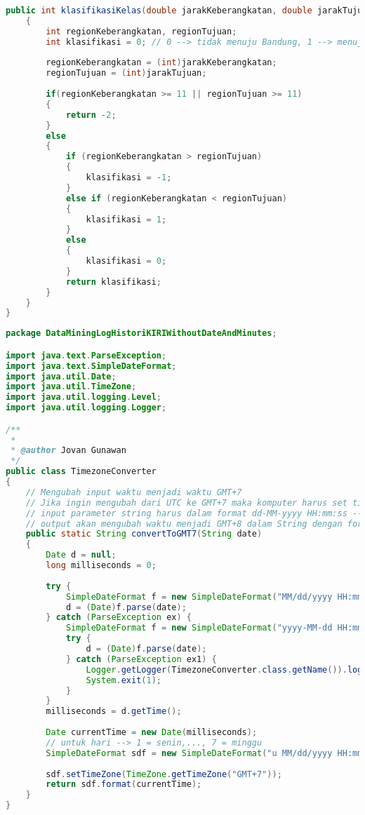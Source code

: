 \begin{lstlisting}[language=Java,basicstyle=\tiny,caption=ProcessingData.java]
    public int klasifikasiKelas(double jarakKeberangkatan, double jarakTujuan)
    {
        int regionKeberangkatan, regionTujuan;
        int klasifikasi = 0; // 0 --> tidak menuju Bandung, 1 --> menuju Bandung, 2 --> menuju region yang sama
        
        regionKeberangkatan = (int)jarakKeberangkatan;
        regionTujuan = (int)jarakTujuan;
        
        if(regionKeberangkatan >= 11 || regionTujuan >= 11)
        {
            return -2;
        }
        else
        {
            if (regionKeberangkatan > regionTujuan)
            {
                klasifikasi = -1;
            }
            else if (regionKeberangkatan < regionTujuan)
            {
                klasifikasi = 1;
            }
            else
            {
                klasifikasi = 0;
            }
            return klasifikasi;
        }
    }
}
\end{lstlisting}

\begin{lstlisting}[language=Java,basicstyle=\tiny,caption=TimezoneConverter.java]
package DataMiningLogHistoriKIRIWithoutDateAndMinutes;

import java.text.ParseException;
import java.text.SimpleDateFormat;
import java.util.Date;
import java.util.TimeZone;
import java.util.logging.Level;
import java.util.logging.Logger;

/**
 *
 * @author Jovan Gunawan
 */
public class TimezoneConverter 
{
    // Mengubah input waktu menjadi waktu GMT+7
    // Jika ingin mengubah dari UTC ke GMT+7 maka komputer harus set timezone ke UTC
    // input parameter string harus dalam format dd-MM-yyyy HH:mm:ss --> contoh 1/1/2014  3:51:15 AM
    // output akan mengubah waktu menjadi GMT+8 dalam String dengan format EEE MM/dd/yyyy HH:mm:ss --> contoh Wed 01/01/2014 03:51:15
    public static String convertToGMT7(String date)
    {
        Date d = null;
        long milliseconds = 0;
        
        try {
            SimpleDateFormat f = new SimpleDateFormat("MM/dd/yyyy HH:mm");
            d = (Date)f.parse(date);
        } catch (ParseException ex) {
            SimpleDateFormat f = new SimpleDateFormat("yyyy-MM-dd HH:mm:ss");
            try {
                d = (Date)f.parse(date);
            } catch (ParseException ex1) {
                Logger.getLogger(TimezoneConverter.class.getName()).log(Level.SEVERE, null, ex);
                System.exit(1);
            }
        }
        milliseconds = d.getTime();
        
        Date currentTime = new Date(milliseconds);
        // untuk hari --> 1 = senin,..., 7 = minggu
        SimpleDateFormat sdf = new SimpleDateFormat("u MM/dd/yyyy HH:mm:ss");
        
        sdf.setTimeZone(TimeZone.getTimeZone("GMT+7"));
        return sdf.format(currentTime);
    }
}
\end{lstlisting}

